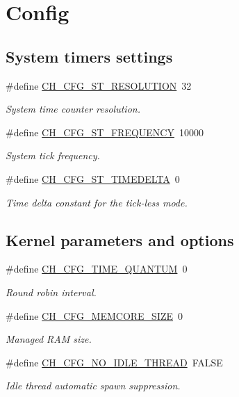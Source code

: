 \hypertarget{group__config}{}\section{Config}
\label{group__config}
\subsection*{System timers settings}
\begin{DoxyCompactItemize}
\item 
\#define \hyperlink{group__config_ga2af9a4c66ec41bad799a27c94728c1ae}{C\+H\+\_\+\+C\+F\+G\+\_\+\+S\+T\+\_\+\+R\+E\+S\+O\+L\+U\+T\+I\+ON}~32
\begin{DoxyCompactList}\small\item\em System time counter resolution. \end{DoxyCompactList}\item 
\#define \hyperlink{group__config_ga174ac107e620ac81bb1487c1ad7ad839}{C\+H\+\_\+\+C\+F\+G\+\_\+\+S\+T\+\_\+\+F\+R\+E\+Q\+U\+E\+N\+CY}~10000
\begin{DoxyCompactList}\small\item\em System tick frequency. \end{DoxyCompactList}\item 
\#define \hyperlink{group__config_ga11ec0b9fb6a84d32dbc8567cc4af4d17}{C\+H\+\_\+\+C\+F\+G\+\_\+\+S\+T\+\_\+\+T\+I\+M\+E\+D\+E\+L\+TA}~0
\begin{DoxyCompactList}\small\item\em Time delta constant for the tick-\/less mode. \end{DoxyCompactList}\end{DoxyCompactItemize}
\subsection*{Kernel parameters and options}
\begin{DoxyCompactItemize}
\item 
\#define \hyperlink{group__config_ga20a364f069f854ccdba167f2cca2526f}{C\+H\+\_\+\+C\+F\+G\+\_\+\+T\+I\+M\+E\+\_\+\+Q\+U\+A\+N\+T\+UM}~0
\begin{DoxyCompactList}\small\item\em Round robin interval. \end{DoxyCompactList}\item 
\#define \hyperlink{group__config_ga185a9549f0d212530070e806680c4949}{C\+H\+\_\+\+C\+F\+G\+\_\+\+M\+E\+M\+C\+O\+R\+E\+\_\+\+S\+I\+ZE}~0
\begin{DoxyCompactList}\small\item\em Managed R\+AM size. \end{DoxyCompactList}\item 
\#define \hyperlink{group__config_ga8c0d4e5b775c997167737f0ca65eb11e}{C\+H\+\_\+\+C\+F\+G\+\_\+\+N\+O\+\_\+\+I\+D\+L\+E\+\_\+\+T\+H\+R\+E\+AD}~F\+A\+L\+SE
\begin{DoxyCompactList}\small\item\em Idle thread automatic spawn suppression. \end{DoxyCompactList}\end{DoxyCompactItemize}
